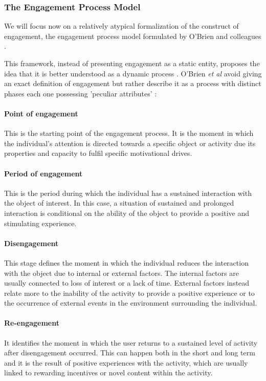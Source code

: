 \subsubsection{The Engagement Process Model}
\label{eng_proc_model}
We will focus now on a relatively atypical formalization of the construct of engagement, the engagement process model formulated by O'Brien and colleagues \cite{o2008user}. 

This framework, instead of presenting engagement as a static entity, proposes the idea that it is better understood as a dynamic process \cite{o2008user}. O'Brien \textit{et al} avoid giving an exact definition of engagement but rather describe it as a process with distinct phases each one possessing 'peculiar attributes' \cite{o2008user}:


\paragraph*{Point of engagement} This is the starting point of the engagement process. It is the moment in which the individual’s attention is directed towards a specific object or activity due its properties and capacity to fulfil specific motivational drives.

\paragraph*{Period of engagement} This is the period during which the individual has a sustained interaction with the object of interest. In this case, a situation of sustained and prolonged interaction is conditional on the ability of the object to provide a positive and stimulating experience.

\paragraph*{Disengagement} This stage defines the moment in which the individual reduces the interaction with the object due to internal or external factors. The internal factors are usually connected to loss of interest or a lack of time. External factors instead relate more to the inability of the activity to provide a positive experience or to the occurrence of external events in the environment surrounding the individual.

\paragraph*{Re-engagement} It identifies the moment in which the user returns to a sustained level of activity after disengagement occurred. This can happen both in the short and long term and it is the result of positive experiences with the activity, which are usually linked to rewarding incentives or novel content within the activity.

